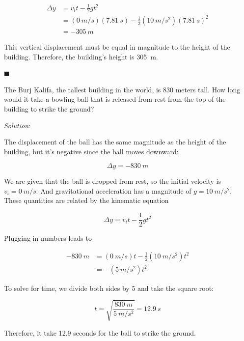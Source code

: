 \documentclass[dvipsnames]{article}
\begin{document}
\begin{align*}
    \Delta y &= v_i t - \frac{1}{2}g t^2 \\[1ex]
    &= (\SI{0}{m/s})(\SI{7.81}{s}) - \frac{1}{2} (\SI{10}{m/s^2})(\SI{7.81}{s})^2 \\[1ex]
    &= -\SI{305}{m}
\end{align*}

This vertical displacement must be equal in magnitude to the height of the building. Therefore, the building's height is \SI{305}{m}.

\hfill $\blacksquare$

\begin{example}
The Burj Kalifa, the tallest building in the world, is 830 meters tall. How long would it take a bowling ball that is released from rest from the top of the building to strike the ground?
\end{example}

\textit{Solution}:

The displacement of the ball has the same magnitude as the height of the building, but it's negative since the ball moves downward:

\begin{equation*}
    \Delta y = -\SI{830}{m}
\end{equation*}

We are given that the ball is dropped from rest, so the initial velocity is $v_i = \SI{0}{m/s}$. And gravitational acceleration has a magnitude of $g = \SI{10}{m/s^2}$. These quantities are related by the kinematic equation

\begin{equation*}
    \Delta y = v_i t - \frac{1}{2}gt^2
\end{equation*}

Plugging in numbers leads to

\begin{align*}
    -\SI{830}{m} &= (\SI{0}{m/s}) t - \frac{1}{2}\left(\SI{10}{m/s^2}\right) t^2 \\[1ex]
    &= -\left(\SI{5}{m/s^2}\right) t^2
\end{align*}

To solve for time, we divide both sides by 5 and take the square root:

\begin{equation*}
    t = \sqrt{\frac{\SI{830}{m}}{\SI{5}{m/s^2}}} = \boxed{\SI{12.9}{s}}
\end{equation*}

Therefore, it take 12.9 seconds for the ball to strike the ground.
\end{document}
